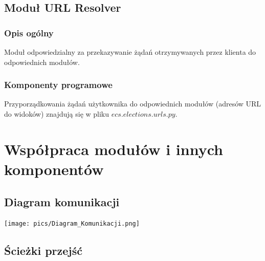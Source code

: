 \documentclass[pdflatex,11pt]{../aghdoc_version2}
\begin{document}
\section{Moduł URL Resolver}
\subsection{Opis ogólny}
Moduł odpowiedzialny za przekazywanie żądań otrzymywanych przez klienta do
odpowiednich modułów.

\subsection{Komponenty programowe}
Przyporządkowania żądań użytkownika do odpowiednich modułów (adresów URL do
widoków) znajdują się w pliku $ecs.elections.urls.py$.

\chapter{Współpraca modułów i innych komponentów}
\section{Diagram komunikacji}
\begin{center}
\centerline{\texttt{[image: pics/Diagram\_Komunikacji.png]}}
\end{center}

\section{Ścieżki przejść}
\end{document}
